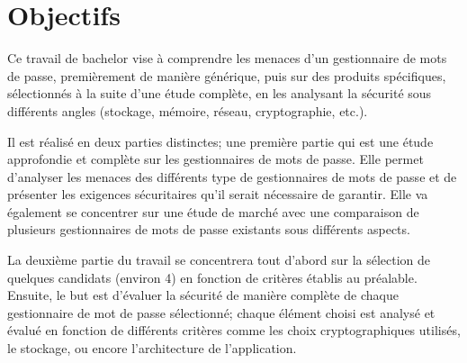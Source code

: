 \section*{Objectifs}
Ce travail de bachelor vise à comprendre les menaces d'un gestionnaire de mots de passe, premièrement de manière générique, puis sur des produits spécifiques, sélectionnés à la suite d'une étude complète, en les analysant la sécurité sous différents angles (stockage, mémoire, réseau, cryptographie, etc.). 

Il est réalisé en deux parties distinctes; une première partie qui est une étude approfondie et complète sur les gestionnaires de mots de passe. Elle permet d'analyser les menaces des différents type de gestionnaires de mots de passe et de présenter les exigences sécuritaires qu'il serait nécessaire de garantir. Elle va également se concentrer sur une étude de marché avec une comparaison de plusieurs gestionnaires de mots de passe existants sous différents aspects.

La deuxième partie du travail se concentrera tout d'abord sur la sélection de quelques candidats (environ 4) en fonction de critères établis au préalable. Ensuite, le but est d'évaluer la sécurité de manière complète de chaque gestionnaire de mot de passe sélectionné; chaque élément choisi est analysé et évalué en fonction de différents critères comme les choix cryptographiques utilisés, le stockage, ou encore l'architecture de l'application.


